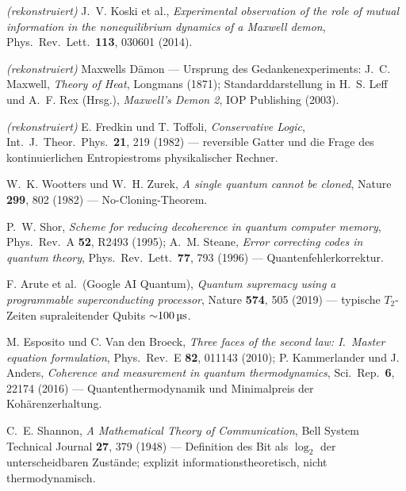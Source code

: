 \documentclass[11pt,a4paper]{article}
\begin{document}
\begin{description}[leftmargin=3.2em,style=sameline,itemsep=0.3em]
\item[{[B11]}] \emph{(rekonstruiert)} J.~V. Koski et al., \emph{Experimental
observation of the role of mutual information in the nonequilibrium dynamics of a
Maxwell demon}, Phys.\ Rev.\ Lett.\ \textbf{113}, 030601 (2014).

\item[{[B12]}] \emph{(rekonstruiert)} Maxwells Dämon --- Ursprung des
Gedankenexperiments: J.~C. Maxwell, \emph{Theory of Heat}, Longmans (1871);
Standarddarstellung in H.~S. Leff und A.~F. Rex (Hrsg.), \emph{Maxwell's Demon 2},
IOP Publishing (2003).

\item[{[B13]}] \emph{(rekonstruiert)} E. Fredkin und T. Toffoli, \emph{Conservative
Logic}, Int.\ J.\ Theor.\ Phys.\ \textbf{21}, 219 (1982) --- reversible Gatter und
die Frage des kontinuierlichen Entropiestroms physikalischer Rechner.

\item[{[B14]}] W.~K. Wootters und W.~H. Zurek, \emph{A single quantum cannot be
cloned}, Nature \textbf{299}, 802 (1982) --- No-Cloning-Theorem.

\item[{[B15]}] P.~W. Shor, \emph{Scheme for reducing decoherence in quantum
computer memory}, Phys.\ Rev.\ A \textbf{52}, R2493 (1995); A.~M. Steane,
\emph{Error correcting codes in quantum theory}, Phys.\ Rev.\ Lett.\ \textbf{77},
793 (1996) --- Quantenfehlerkorrektur.

\item[{[B16]}] F. Arute et al.\ (Google AI Quantum), \emph{Quantum supremacy using
a programmable superconducting processor}, Nature \textbf{574}, 505 (2019) ---
typische $T_2$-Zeiten supraleitender Qubits ${\sim}100\,\text{\textmu s}$.

\item[{[B17]}] M. Esposito und C. Van den Broeck, \emph{Three faces of the second
law: I.\ Master equation formulation}, Phys.\ Rev.\ E \textbf{82}, 011143 (2010);
P. Kammerlander und J. Anders, \emph{Coherence and measurement in quantum
thermodynamics}, Sci.\ Rep.\ \textbf{6}, 22174 (2016) --- Quantenthermodynamik und
Minimalpreis der Kohärenzerhaltung.

\item[{[B18]}] C.~E. Shannon, \emph{A Mathematical Theory of Communication}, Bell
System Technical Journal \textbf{27}, 379 (1948) --- Definition des Bit als
$\log_2$ der unterscheidbaren Zustände; explizit informationstheoretisch, nicht
thermodynamisch.


\end{description}
\end{document}

